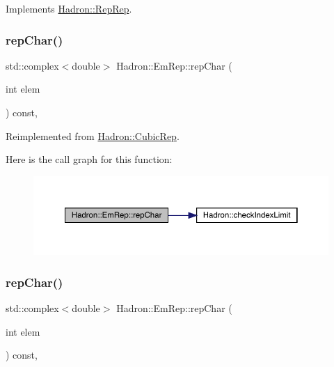 Implements \mbox{\hyperlink{structHadron_1_1RepRep_ab3213025f6de249f7095892109575fde}{Hadron\+::\+Rep\+Rep}}.

\mbox{\label{structHadron_1_1EmRep_ab57e91b1997f75e0eff8a03bac6f34db}} 
\subsubsection{\texorpdfstring{repChar()}{repChar()}\hspace{0.1cm}{\footnotesize\ttfamily [1/3]}}
{\footnotesize\ttfamily std\+::complex$<$double$>$ Hadron\+::\+Em\+Rep\+::rep\+Char (\begin{DoxyParamCaption}\item[{int}]{elem }\end{DoxyParamCaption}) const\hspace{0.3cm}{\ttfamily [inline]}, {\ttfamily [virtual]}}



Reimplemented from \mbox{\hyperlink{structHadron_1_1CubicRep_af45227106e8e715e84b0af69cd3b36f8}{Hadron\+::\+Cubic\+Rep}}.

Here is the call graph for this function\+:
\nopagebreak
\begin{figure}[H]
\begin{center}
\leavevmode
\includegraphics[width=350pt]{d6/d4b/structHadron_1_1EmRep_ab57e91b1997f75e0eff8a03bac6f34db_cgraph}
\end{center}
\end{figure}
\mbox{\label{structHadron_1_1EmRep_ab57e91b1997f75e0eff8a03bac6f34db}} 
\subsubsection{\texorpdfstring{repChar()}{repChar()}\hspace{0.1cm}{\footnotesize\ttfamily [2/3]}}
{\footnotesize\ttfamily std\+::complex$<$double$>$ Hadron\+::\+Em\+Rep\+::rep\+Char (\begin{DoxyParamCaption}\item[{int}]{elem }\end{DoxyParamCaption}) const\hspace{0.3cm}{\ttfamily [inline]}, {\ttfamily [virtual]}}



